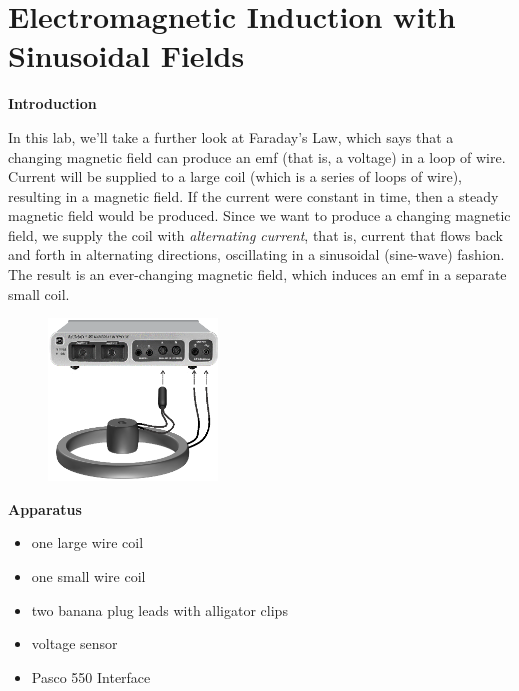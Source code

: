 
\section{Electromagnetic Induction with Sinusoidal Fields}

\makelabheader %

\bigskip

\textbf{Introduction}

In this lab, we'll take a further look at Faraday's Law, which says
that a changing magnetic field can produce an emf (that is, a voltage)
in a loop of wire.  Current will be supplied to a large coil (which is a 
series of loops of wire), resulting in a magnetic field.  
If the current were constant in time,
then a steady magnetic field would be produced.  Since we want to
produce a changing magnetic field, we supply the coil with {\it
alternating current}, that is, current that flows back and forth in
alternating directions, oscillating in a sinusoidal (sine-wave) fashion.  The
result is an ever-changing magnetic field, which induces an emf in
a separate small coil.

\begin{figure}
    \includegraphics[width=0.4\textwidth]{induction2/induction2_setup_550.eps}
\end{figure}

\bigskip

\textbf{Apparatus}
\begin{itemize}
\setlength\itemsep{-2pt}
\setlength\topsep{-6pt}
\setlength\partopsep{-6pt}
\vspace{-0.15in}  %
\item one large wire coil
\item one small wire coil
\item two banana plug leads with alligator clips
\item voltage sensor
\item Pasco 550 Interface
\end{itemize}

